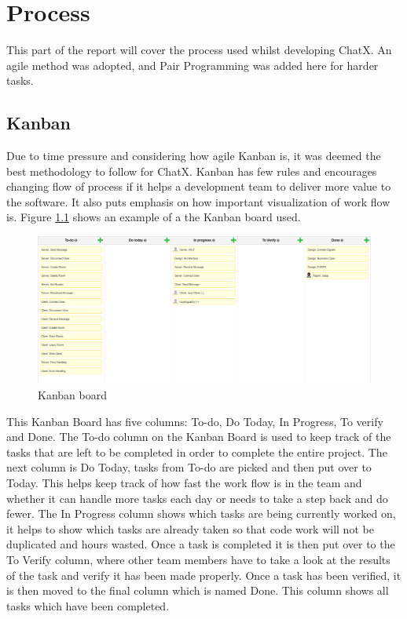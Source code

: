 \chapter{Process}
This part of the report will cover the process used whilst developing ChatX. An agile method was adopted, and Pair Programming was added here for harder tasks.

\section{Kanban}
Due to time pressure and considering how agile Kanban is, it was deemed the best methodology to follow for ChatX. Kanban has few rules and encourages changing flow of process if it helps a development team to deliver more value to the software. It also puts emphasis on how important visualization of work flow is. Figure \ref{fig:KanbanBoard} shows an example of a the Kanban board used.  %

\begin{figure}[H]
	\centering
	\includegraphics[width=0.7\linewidth]{"img/Kanban Board"}
	\caption{Kanban board}
	\label{fig:KanbanBoard}
\end{figure}

This Kanban Board has five columns: To-do, Do Today, In Progress, To verify and Done. 
The To-do column on the Kanban Board is used to keep track of the tasks that are left to be completed in order to complete the entire project. The next column is Do Today, tasks from To-do are picked and then put over to Today. This helps keep track of how fast the work flow is in the team and whether it can handle more tasks each day or needs to take a step back and do fewer. The In Progress column shows which tasks are being currently worked on, it helps to show which tasks are already taken so that code work will not be duplicated and hours wasted. Once a task is completed it is then put over to the To Verify column, where other team members have to take a look at the results of the task and verify it has been made properly. Once a task has been verified, it is then moved to the final column which is named Done. This column shows all tasks which have been completed. 


